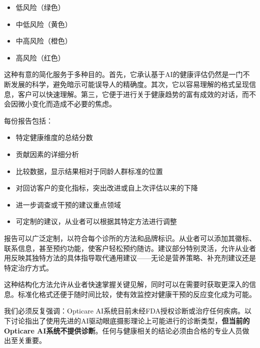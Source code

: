 \documentclass[
  Letterpaper,
]{scrbook}
\providecommand{\tightlist}{%
  \setlength{\itemsep}{0pt}\setlength{\parskip}{0pt}}\usepackage{longtable,booktabs,array}
\begin{document}
\begin{itemize}
\tightlist
\item
  低风险（绿色）
\item
  中低风险（黄色）
\item
  中高风险（橙色）
\item
  高风险（红色）
\end{itemize}

这种有意的简化服务于多种目的。首先，它承认基于AI的健康评估仍然是一门不断发展的科学，避免暗示可能误导人的精确度。其次，它以容易理解的格式呈现信息，客户可以快速理解。第三，它便于进行关于健康趋势的富有成效的对话，而不会因微小变化而造成不必要的焦虑。

每份报告包括：

\begin{itemize}
\tightlist
\item
  特定健康维度的总结分数
\item
  贡献因素的详细分析
\item
  比较数据，显示结果相对于同龄人群标准的位置
\item
  对回访客户的变化指标，突出改进或自上次评估以来的下降
\item
  进一步调查或干预的建议重点领域
\item
  可定制的建议，从业者可以根据其特定方法进行调整
\end{itemize}

报告可以广泛定制，以符合每个诊所的方法和品牌标识。从业者可以添加其徽标、联系信息，甚至预约功能，使客户轻松预约随访。建议部分特别灵活，允许从业者用反映其独特方法的具体指导取代通用建议------无论是营养策略、补充剂建议还是特定治疗方式。

这种结构化方法允许从业者快速掌握关键见解，同时可以在需要时获取更深入的信息。标准化格式还便于随时间比较，使有效监控对健康干预的反应变化成为可能。

\begin{tcolorbox}[enhanced jigsaw, arc=.35mm, breakable, colbacktitle=quarto-callout-caution-color!10!white, colback=white, toprule=.15mm, opacityback=0, left=2mm, titlerule=0mm, colframe=quarto-callout-caution-color-frame, bottomrule=.15mm, toptitle=1mm, bottomtitle=1mm, rightrule=.15mm, leftrule=.75mm, coltitle=black, title=\textcolor{quarto-callout-caution-color}{\faFire}\hspace{0.5em}{警告：不用于诊断}, opacitybacktitle=0.6]

我们必须反复强调：Opticare
AI系统目前未经FDA授权诊断或治疗任何疾病。以下讨论指出了使用先进的AI驱动眼底摄影理论上可能进行的诊断类型，\textbf{但当前的Opticare
AI系统不提供诊断}。任何与健康相关的结论必须由合格的专业人员做出至关重要。

\end{tcolorbox}
\end{document}
